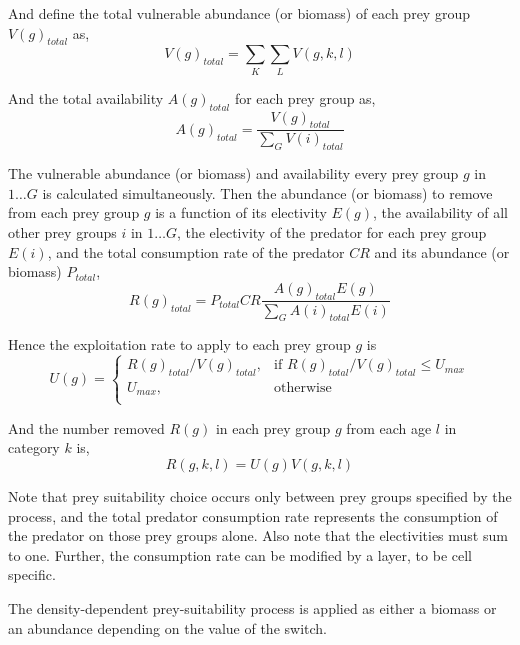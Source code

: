 And define the total vulnerable abundance (or biomass) of each prey group $V(g)_{total}$ as,
\begin{equation}
  V(g)_{total}  = \sum\limits_K {\sum\limits_L {V(g,k,l)}} 
\end{equation}

And the total availability $A(g)_{total}$ for each prey group as,
\begin{equation}
  A(g)_{total} = \frac{V(g)_{total}}{\sum\limits_G {V(i)_{total}}}
\end{equation}

The vulnerable abundance (or biomass) and availability every prey group $g$ in $1 \ldots G$ is calculated simultaneously. Then the abundance (or biomass) to remove from each prey group $g$ is a function of its electivity $E(g)$, the availability of all other prey groups $i$ in $1 \ldots G$, the electivity of the predator for each prey group $E(i)$, and the total consumption rate of the predator $CR$ and its abundance (or biomass) $P_{total}$,
\begin{equation}
  R(g)_{total}=P_{total} CR \frac{A(g)_{total} E(g)}{\sum\limits_G {A(i)_{total} E(i)}}
\end{equation}

Hence the exploitation rate to apply to each prey group $g$ is 
\begin{equation}
U(g) = \begin{cases}
  R(g)_{total}/V(g)_{total}, & \text{if $R(g)_{total}/V(g)_{total} \leq U_{max}$} \\
  U_{max}, & \text{otherwise}\\ 
  \end{cases} 
\end{equation}

And the number removed $R(g)$ in each prey group $g$ from each age $l$ in category $k$ is,
\begin{equation}
  R(g,k,l) = U(g)V(g,k,l)
\end{equation}

Note that prey suitability choice occurs only between prey groups specified by the process, and the total predator consumption rate represents the consumption of the predator on those prey groups alone. Also note that the electivities must sum to one. Further, the consumption rate can be modified by a layer, to be cell specific. 

The density-dependent prey-suitability process is applied as either a biomass or an abundance depending on the value of the  switch.

